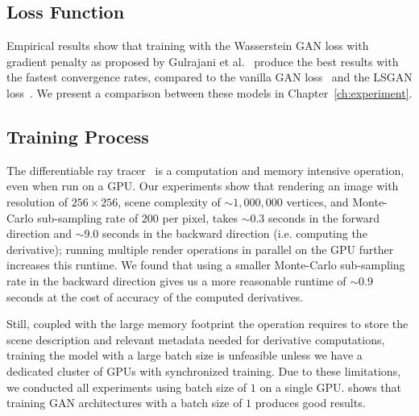 \subsection{Loss Function}

Empirical results show that training with the Wasserstein GAN loss with gradient penalty as
proposed by Gulrajani et al.~\cite{gulrajani2017improved} produce the best results with the
fastest convergence rates, compared to the vanilla GAN loss~\cite{goodfellow2014generative}
and the LSGAN loss~\cite{mao2017least}. We present a comparison between these models in
Chapter~\ref{ch:experiment}.

\subsection{Training Process} \label{training-process}

The differentiable ray tracer~\cite{li2018differentiable} is a computation and memory
intensive operation, even when run on a GPU. Our experiments show that rendering an image
with resolution of $256 \times 256$, scene complexity of $\mathtt{\sim} 1,000,000$ vertices,
and Monte-Carlo sub-sampling rate of $200$ per pixel, takes $\mathtt{\sim} 0.3$ seconds in
the forward direction and $\mathtt{\sim} 9.0$ seconds in the backward direction (i.e.
computing the derivative); running multiple render operations in parallel on the GPU further
increases this runtime. We found that using a smaller Monte-Carlo sub-sampling rate in the
backward direction gives us a more reasonable runtime of $\mathtt{\sim}  0.9$ seconds at the cost
of accuracy of the computed derivatives.

Still, coupled with the large memory footprint the operation requires to store the scene
description and relevant metadata needed for derivative computations, training the model
with a large batch size is unfeasible unless we have a dedicated cluster of GPUs with
synchronized training. Due to these limitations, we conducted all experiments using batch size
of $1$ on a single GPU. \cite{zhu2017unpaired} shows that training GAN architectures with a batch
size of $1$ produces good results.
